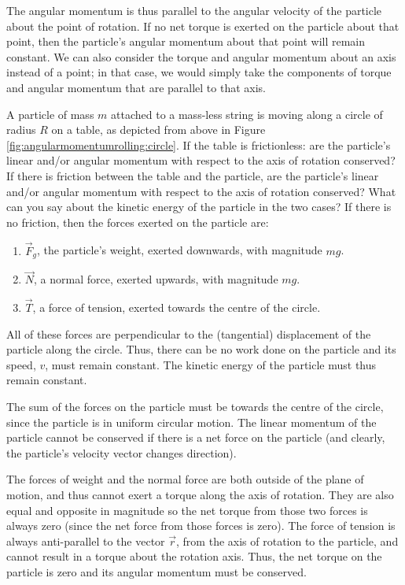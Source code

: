 The angular momentum is thus parallel to the angular velocity of the particle about the point of rotation. If no net torque is exerted on the particle about that point, then the particle's angular momentum about that point will remain constant. We can also consider the torque and angular momentum about an axis instead of a point; in that case, we would simply take the components of torque and angular momentum that are parallel to that axis. 

\begin{example}{
A particle of mass $m$ attached to a mass-less string is moving along a circle of radius $R$ on a table, as depicted from above in Figure \ref{fig:angularmomentumrolling:circle}. If the table is frictionless: are the particle's linear and/or angular momentum with respect to the axis of rotation conserved? If there is friction between the table and the particle, are the particle's linear and/or angular momentum with respect to the axis of rotation conserved? What can you say about the kinetic energy of the particle in the two cases?}
If there is no friction, then the forces exerted on the particle are:
\begin{enumerate}
\item $\vec F_g$, the particle's weight, exerted downwards, with magnitude $mg$.
\item $\vec N$, a normal force, exerted upwards, with magnitude $mg$.
\item $\vec T$, a force of tension, exerted towards the centre of the circle.
\end{enumerate}
All of these forces are perpendicular to the (tangential) displacement of the particle along the circle. Thus, there can be no work done on the particle and its speed, $v$, must remain constant. The kinetic energy of the particle must thus remain constant.

The sum of the forces on the particle must be towards the centre of the circle, since the particle is in uniform circular motion. The linear momentum of the particle cannot be conserved if there is a net force on the particle (and clearly, the particle's velocity vector changes direction). 

The forces of weight and the normal force are both outside of the plane of motion, and thus cannot exert a torque along the axis of rotation. They are also equal and opposite in magnitude so the net torque from those two forces is always zero (since the net force from those forces is zero). The force of tension is always anti-parallel to the vector $\vec r$, from the axis of rotation to the particle, and cannot result in a torque about the rotation axis. Thus, the net torque on the particle is zero and its angular momentum must be conserved. 


\end{example}
